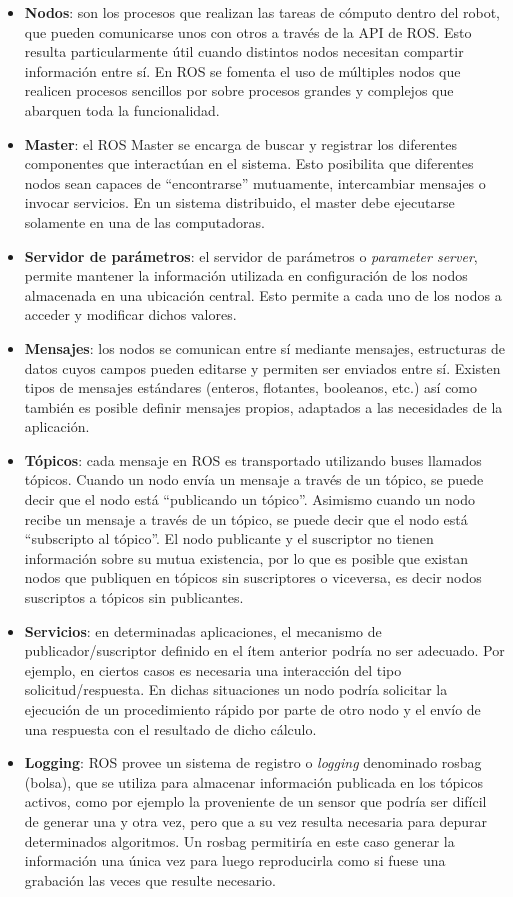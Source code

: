 \begin{itemize}
    \item \textbf{Nodos}: son los procesos que realizan las tareas de cómputo dentro del robot, que pueden comunicarse unos con otros a través de la API de ROS. Esto resulta particularmente útil cuando distintos nodos necesitan compartir información entre sí. En ROS se fomenta el uso de múltiples nodos que realicen procesos sencillos por sobre procesos grandes y complejos que abarquen toda la funcionalidad.
    \item \textbf{Master}: el ROS Master se encarga de buscar y registrar los diferentes componentes que interactúan en el sistema. Esto posibilita que diferentes nodos sean capaces de ``encontrarse'' mutuamente, intercambiar mensajes o invocar servicios. En un sistema distribuido, el master debe ejecutarse solamente en una de las computadoras.
    \item \textbf{Servidor de parámetros}: el servidor de parámetros o \textit{parameter server}, permite mantener la información utilizada en configuración de los nodos almacenada en una ubicación central. Esto permite a cada uno de los nodos a acceder y modificar dichos valores.
    \item \textbf{Mensajes}: los nodos se comunican entre sí mediante mensajes, estructuras de datos cuyos campos pueden editarse y permiten ser enviados entre sí. Existen tipos de mensajes estándares (enteros, flotantes, booleanos, etc.) así como también es posible definir mensajes propios, adaptados a las necesidades de la aplicación.
    \item \textbf{Tópicos}: cada mensaje en ROS es transportado utilizando buses llamados tópicos. Cuando un nodo envía un mensaje a través de un tópico, se puede decir que el nodo está ``publicando un tópico''. Asimismo cuando un nodo recibe un mensaje a través de un tópico, se puede decir que el nodo está ``subscripto al tópico''. El nodo publicante y el suscriptor no tienen información sobre su mutua existencia, por lo que es posible que existan nodos que publiquen en tópicos sin suscriptores o viceversa, es decir nodos suscriptos a tópicos sin publicantes.
    \item \textbf{Servicios}: en determinadas aplicaciones, el mecanismo de publicador/suscriptor definido en el ítem anterior podría no ser adecuado. Por ejemplo, en ciertos casos es necesaria una interacción del tipo solicitud/respuesta. En dichas situaciones un nodo podría solicitar la ejecución de un procedimiento rápido por parte de otro nodo y el envío de una respuesta con el resultado de dicho cálculo.
    \item \textbf{Logging}: ROS provee un sistema de registro o \textit{logging} denominado rosbag (bolsa), que se utiliza para almacenar información publicada en los tópicos activos, como por ejemplo la proveniente de un sensor que podría ser difícil de generar una y otra vez, pero que a su vez resulta necesaria para depurar determinados algoritmos. Un rosbag permitiría en este caso generar la información una única vez para luego reproducirla como si fuese una grabación las veces que resulte necesario.
\end{itemize}

